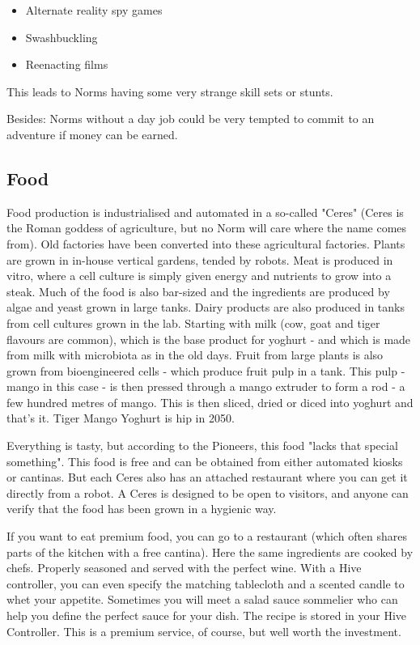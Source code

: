 \begin{itemize}
    \item Alternate reality spy games
    \item Swashbuckling
    \item Reenacting films
\end{itemize}

This leads to Norms having some very strange skill sets or stunts.

Besides: Norms without a day job could be very tempted to commit to an adventure if money can be earned.

\subsection{Food}
\label{sec: norm food}

Food production is industrialised and automated in a so-called "Ceres" (Ceres is the Roman goddess of agriculture, but no Norm will care where the name comes from). Old factories have been converted into these agricultural factories. Plants are grown in in-house vertical gardens, tended by robots.
Meat is produced in vitro, where a cell culture is simply given energy and nutrients to grow into a steak. Much of the food is also bar-sized and the ingredients are produced by algae and yeast grown in large tanks.
Dairy products are also produced in tanks from cell cultures grown in the lab. Starting with milk (cow, goat and tiger flavours are common), which is the base product for yoghurt - and which is made from milk with microbiota as in the old days.
Fruit from large plants is also grown from bioengineered cells - which produce fruit pulp in a tank. This pulp - mango in this case - is then pressed through a mango extruder to form a rod - a few hundred metres of mango. This is then sliced, dried or diced into yoghurt and that's it. Tiger Mango Yoghurt is hip in 2050.

Everything is tasty, but according to the Pioneers, this food "lacks that special something".
This food is free and can be obtained from either automated kiosks or cantinas. But each Ceres also has an attached restaurant where you can get it directly from a robot. A Ceres is designed to be open to visitors, and anyone can verify that the food has been grown in a hygienic way.

If you want to eat premium food, you can go to a restaurant (which often shares parts of the kitchen with a free cantina). Here the same ingredients are cooked by chefs. Properly seasoned and served with the perfect wine. With a Hive controller, you can even specify the matching tablecloth and a scented candle to whet your appetite.
Sometimes you will meet a salad sauce sommelier who can help you define the perfect sauce for your dish. The recipe is stored in your Hive Controller. This is a premium service, of course, but well worth the investment.

